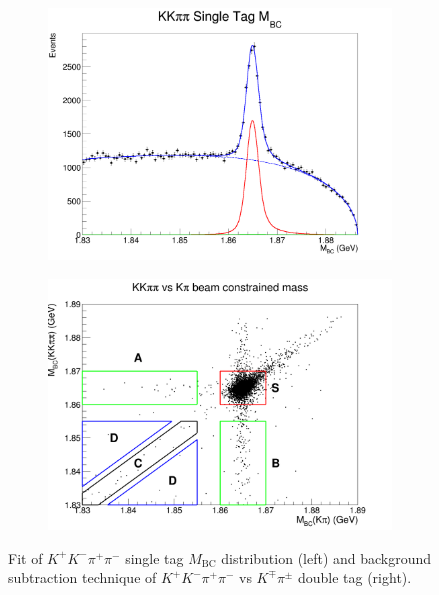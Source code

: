 \documentclass[12pt, a4paper, notitlepage, onecolumn]{article}
\begin{document}
\begin{figure}[H] 
  \centering
  \begin{subfigure}{0.5\textwidth}
    \centering
    \includegraphics[width=1\textwidth]{Plots/KKpipiSingleTagMBCPlot.png}
    \caption{}
    \label{fig_styield}
  \end{subfigure}%
  \begin{subfigure}{0.5\textwidth}
    \centering
    \includegraphics[width=1\textwidth]{Plots/KpiDoubleTagYield.png}
    \caption{}
    \label{fig_dtyield}
  \end{subfigure}
  \caption{Fit of $K^+K^-\pi^+\pi^-$ single tag $M_\text{BC}$ distribution (left) and background subtraction technique of $K^+K^-\pi^+\pi^-$ vs $K^\mp\pi^\pm$ double tag (right).}
\end{figure}
\end{document}
